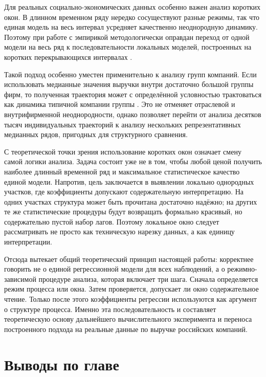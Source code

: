 Для реальных социально-экономических данных особенно важен анализ коротких окон. В длинном временном ряду нередко сосуществуют разные режимы, так что единая модель на весь интервал усредняет качественно неоднородную динамику. Поэтому при работе с эмпирикой методологически оправдан переход от одной модели на весь ряд к последовательности локальных моделей, построенных на коротких перекрывающихся интервалах \cite{polunin-yudanov-2020,coad,hamilton}.

Такой подход особенно уместен применительно к анализу групп компаний. Если использовать медианные значения выручки внутри достаточно большой группы фирм, то полученная траектория может с определённой условностью трактоваться как динамика типичной компании группы \cite{polunin-yudanov-2020,coad}. Это не отменяет отраслевой и внутрифирменной неоднородности, однако позволяет перейти от анализа десятков тысяч индивидуальных траекторий к анализу нескольких репрезентативных медианных рядов, пригодных для структурного сравнения.

С теоретической точки зрения использование коротких окон означает смену самой логики анализа. Задача состоит уже не в том, чтобы любой ценой получить наиболее длинный временной ряд и максимальное статистическое качество единой модели. Напротив, цель заключается в выявлении локально однородных участков, где коэффициенты допускают содержательную интерпретацию. На одних участках структура может быть прочитана достаточно надёжно; на других те же статистические процедуры будут возвращать формально красивый, но содержательно пустой набор лагов. Поэтому локальное окно следует рассматривать не просто как техническую нарезку данных, а как единицу интерпретации.

Отсюда вытекает общий теоретический принцип настоящей работы: корректнее говорить не о единой регрессионной модели для всех наблюдений, а о режимно-зависимой процедуре анализа, которая включает три шага. Сначала определяется режим процесса или окна. Затем проверяется, допускает ли окно содержательное чтение. Только после этого коэффициенты регрессии используются как аргумент о структуре процесса. Именно эта последовательность и составляет теоретическую основу дальнейшего вычислительного эксперимента и переноса построенного подхода на реальные данные по выручке российских компаний.

\section{Выводы по главе}
\label{sec:theory-conclusions}


